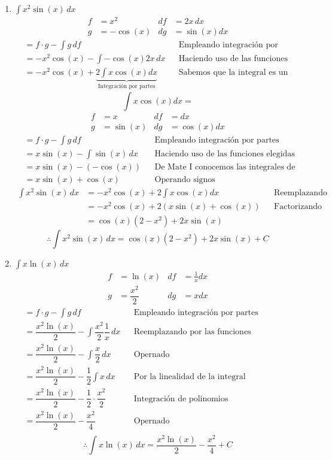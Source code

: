 \documentclass[letterpaper]{article}
\renewcommand{\*}{\cdot}
\theoremstyle{definition}
\begin{document}
\begin{enumerate}
\begin{enumerate}
	\item$\displaystyle \int x^2 \sin(x) \, dx$
	\begin{align*}
		f &= x^2 & df &=2x\,dx \\
		g &= -\cos(x) & dg &= \sin(x)dx
	\end{align*}
	\begin{align*}
		&= f \* g - \int g\,df &&\text{Empleando integración por partes}\\
		&= -x^2\cos(x) - \int -\cos(x)2x\,dx &&\text{Haciendo uso de las funciones elegidas}\\
		&= -x^2\cos(x) + \underbrace{2\int x\cos(x)dx}_\text{Integración por partes} &&\text{Sabemos que la integral es un operador lineal}
	\end{align*}
	\[ \int x\cos(x)dx = \]
	\begin{align*}
		f &= x & df &=dx \\
		g &= \sin(x) & dg &= \cos(x)dx
	\end{align*}
	\begin{align*}
		&= f \* g - \int g\,df &&\text{Empleando integración por partes}\\
		&= x\sin(x) - \int \sin(x)\,dx &&\text{Haciendo uso de las funciones elegidas}\\
		&= x\sin(x) - (-\cos(x)) &&\text{De Mate I conocemos las integrales de las f. trigonométricas}\\
		&= x\sin(x) + \cos(x) &&\text{Operando signos}
	\end{align*}
	\begin{align*}
		\int x^2 \sin(x) \, dx &= -x^2\cos(x) + 2\int x\cos(x)dx &&\text{Reemplazando en el resultado anterior}\\
		&= -x^2\cos(x) + 2(x\sin(x) + \cos(x)) &&\text{Factorizando }\\
		&= \cos(x)(2 -x^2) +2x\sin(x) &&\text{ }
	\end{align*}
	\[ \therefore 	\int x^2 \sin(x) \, dx = \cos(x)(2 -x^2) +2x\sin(x)  +C \]
	 \newpage
	\item$\displaystyle \int x \ln(x) \, dx$
	\begin{align*}
		f &= \ln(x) & df &=\frac{1}{x}dx \\
		g &= \dfrac{x^2}{2} & dg &= xdx
	\end{align*}
	\begin{align*}
		&= f \* g - \int g\,df &&\text{Empleando integración por partes}\\
		&= \dfrac{x^2\ln(x)}{2} - \int \dfrac{x^2}{2}\dfrac{1}{x}\,dx && \text{Reemplazando por las funciones seleccionadas}\\
		&= \dfrac{x^2\ln(x)}{2} - \int \dfrac{x}{2}\,dx && \text{Opernado}\\
		&= \dfrac{x^2\ln(x)}{2} - \dfrac{1}{2}\int x\,dx && \text{Por la linealidad de la integral}\\
		&= \dfrac{x^2\ln(x)}{2} - \dfrac{1}{2}\* \dfrac{x^2}{2}&& \text{Integración de polinomios}\\
		&= \dfrac{x^2\ln(x)}{2} - \dfrac{x^2}{4}&& \text{Opernado}\\
	\end{align*}
	\[ \therefore \int x \ln(x) \, dx =  \dfrac{x^2\ln(x)}{2} - \dfrac{x^2}{4} + C\]
	

\end{enumerate}
\end{enumerate}
\end{document}
